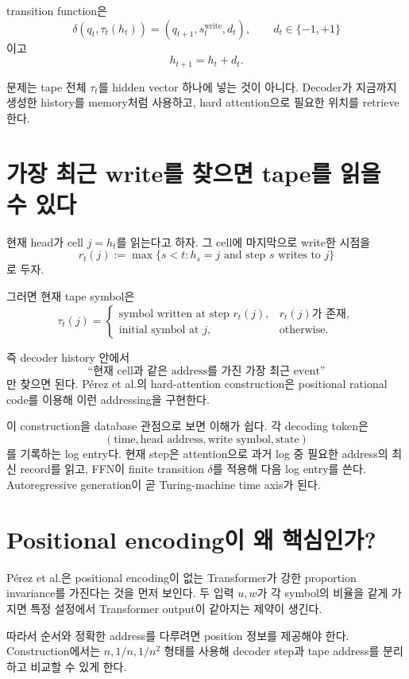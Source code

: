 \documentclass[11pt,a4paper,oneside,openany]{memoir}
\theoremstyle{definition}
\begin{document}
transition function은
\[
\delta(q_t,\tau_t(h_t))
=
(q_{t+1},s_t^{\mathrm{write}},d_t),
\qquad d_t\in\{-1,+1\}
\]
이고
\[
h_{t+1}=h_t+d_t.
\]

문제는 tape 전체 $\tau_t$를 hidden vector 하나에 넣는 것이 아니다.
Decoder가 지금까지 생성한 history를 memory처럼 사용하고, hard attention으로 필요한 위치를 retrieve한다.

\section{가장 최근 write를 찾으면 tape를 읽을 수 있다}

현재 head가 cell $j=h_t$를 읽는다고 하자. 그 cell에 마지막으로 write한 시점을
\[
r_t(j)
:=
\max\{s<t: h_s=j\text{ and step }s\text{ writes to }j\}
\]
로 두자.

그러면 현재 tape symbol은
\[
\tau_t(j)=
\begin{cases}
\text{symbol written at step }r_t(j), & r_t(j)\text{가 존재},\\
\text{initial symbol at }j, & \text{otherwise}.
\end{cases}
\]

즉 decoder history 안에서
\[
\boxed{\text{``현재 cell과 같은 address를 가진 가장 최근 event''}}
\]
만 찾으면 된다. Pérez et al.의 hard-attention construction은 positional rational code를 이용해 이런 addressing을 구현한다.

\begin{suppbox}
이 construction을 database 관점으로 보면 이해가 쉽다. 각 decoding token은
\[
(\text{time},\text{head address},\text{write symbol},\text{state})
\]
를 기록하는 log entry다. 현재 step은 attention으로 과거 log 중 필요한 address의 최신 record를 읽고, FFN이 finite transition $\delta$를 적용해 다음 log entry를 쓴다. Autoregressive generation이 곧 Turing-machine time axis가 된다.
\end{suppbox}

\section{Positional encoding이 왜 핵심인가?}

Pérez et al.은 positional encoding이 없는 Transformer가 강한 proportion invariance를 가진다는 것을 먼저 보인다.
두 입력 $u,w$가 각 symbol의 비율을 같게 가지면 특정 설정에서 Transformer output이 같아지는 제약이 생긴다.

따라서 순서와 정확한 address를 다루려면 position 정보를 제공해야 한다.
Construction에서는 $n,1/n,1/n^2$ 형태를 사용해 decoder step과 tape address를 분리하고 비교할 수 있게 한다.
\end{document}

